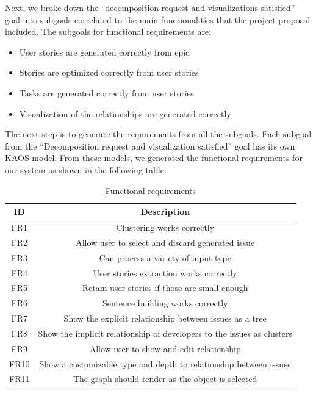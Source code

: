 Next, we broke down the “decomposition request and visualizations satisfied” goal into subgoals correlated to the main functionalities that the project proposal included. The subgoals for functional requirements are: 

\begin{itemize}
	\item User stories are generated correctly from epic
	\item Stories are optimized correctly from user stories
	\item Tasks are generated correctly from user stories
	\item Visualization of the relationships are generated correctly
\end{itemize}

The next step is to generate the requirements from all the subgoals. Each subgoal from the “Decomposition request and visualization satisfied” goal has its own KAOS model. From these models, we generated the functional requirements for our system as shown in the following table.

\begin{center}
\begin{table}
\caption{Functional requirements}
\begin{tabular}{ |c|c| } 
\hline
\multicolumn{1}{|c|}{\textbf{ID}} & \multicolumn{1}{c|}{\textbf{Description}} \\
\hline
FR1 & Clustering works correctly \\
\hline
FR2 & Allow user to select and discard generated issue \\
\hline
FR3 & Can process a variety of input type \\
\hline
FR4 & User stories extraction works correctly \\
\hline
FR5 & Retain user stories if those are small enough \\
\hline
FR6 & Sentence building works correctly \\
\hline
FR7 & Show the explicit relationship between issues as a tree \\
\hline
FR8 & Show the implicit relationship of developers to the issues as clusters \\
\hline
FR9 & Allow user to show and edit relationship \\
\hline
FR10 & Show a customizable type and depth to relationship between issues \\
\hline
FR11 & The graph should render as the object is selected \\
\hline
\end{tabular}
\end{table}
\end{center}